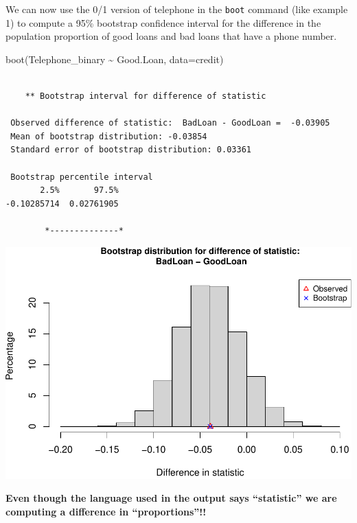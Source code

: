 \documentclass[
]{book}
\newenvironment{Shaded}{\begin{snugshade}}{\end{snugshade}}
\newcommand{\AttributeTok}[1]{\textcolor[rgb]{0.77,0.63,0.00}{#1}}
\newcommand{\FunctionTok}[1]{\textcolor[rgb]{0.00,0.00,0.00}{#1}}
\newcommand{\NormalTok}[1]{#1}
\newcommand{\SpecialCharTok}[1]{\textcolor[rgb]{0.00,0.00,0.00}{#1}}
\begin{document}
We can now use the 0/1 version of telephone in the \texttt{boot} command (like example 1) to compute a 95\% bootstrap confidence interval for the difference in the population proportion of good loans and bad loans that have a phone number.

\begin{Shaded}
\begin{Highlighting}[]
\FunctionTok{boot}\NormalTok{(Telephone\_binary }\SpecialCharTok{\textasciitilde{}}\NormalTok{ Good.Loan, }\AttributeTok{data=}\NormalTok{credit)}
\end{Highlighting}
\end{Shaded}

\begin{verbatim}

    ** Bootstrap interval for difference of statistic

 Observed difference of statistic:  BadLoan - GoodLoan =  -0.03905 
 Mean of bootstrap distribution: -0.03854 
 Standard error of bootstrap distribution: 0.03361 

 Bootstrap percentile interval
       2.5%       97.5% 
-0.10285714  0.02761905 

        *--------------*
\end{verbatim}

\includegraphics[width=1\linewidth]{Class_Activity_8_files/figure-latex/unnamed-chunk-14-1}

\textbf{Even though the language used in the output says ``statistic'' we are computing a difference in ``proportions''!!}
\end{document}
